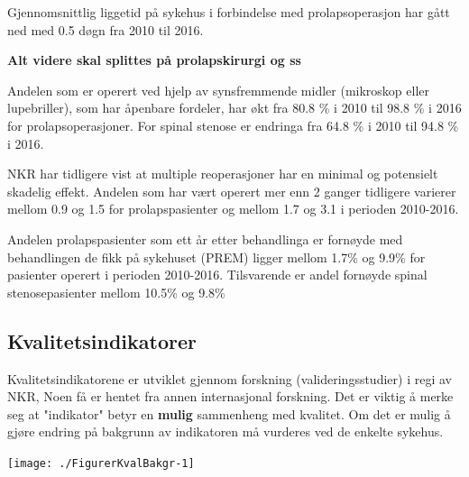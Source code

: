 \documentclass [norsk,a4paper,twoside]{article}\usepackage[]{graphicx}\usepackage[]{color}
\newenvironment{knitrout}{}{} %
\begin{document}
Gjennomsnittlig liggetid på sykehus i forbindelse med prolapsoperasjon har gått ned med 0.5 døgn fra 2010 til 2016.



\textbf{Alt videre skal splittes på prolapskirurgi og ss}



Andelen som er operert ved hjelp av synsfremmende midler (mikroskop eller
lupebriller), som har åpenbare fordeler, har økt fra 80.8 \% i 2010 til 
98.8 \% i 2016 for prolapsoperasjoner. For spinal stenose er endringa fra 64.8 \% i 2010 til 
94.8 \% i 2016.

NKR har tidligere vist at multiple reoperasjoner har en minimal og potensielt skadelig
effekt. Andelen som har vært operert mer enn 2 ganger tidligere varierer mellom 0.9 
og 1.5 for prolapspasienter og mellom 1.7 
og 3.1 i perioden 2010-2016. 

Andelen prolapspasienter som ett år etter behandlinga er fornøyde med behandlingen de fikk på sykehuset (PREM) ligger mellom 1.7\% og 9.9\% for pasienter operert i perioden 2010-2016. Tilsvarende er andel fornøyde spinal stenosepasienter mellom 10.5\% og 9.8\%

\subsection{Kvalitetsindikatorer}

Kvalitetsindikatorene er  utviklet gjennom forskning (valideringsstudier)  i regi av NKR, Noen få er hentet fra annen internasjonal forskning.  Det er viktig å merke seg at "indikator" betyr en \textbf{mulig} sammenheng med kvalitet. Om det er mulig å gjøre endring på bakgrunn av indikatoren må vurderes ved de enkelte sykehus.


\begin{knitrout}
\color{fgcolor}

{\centering \texttt{[image: ./FigurerKvalBakgr-1]} 

}



\end{knitrout}
\end{document}
